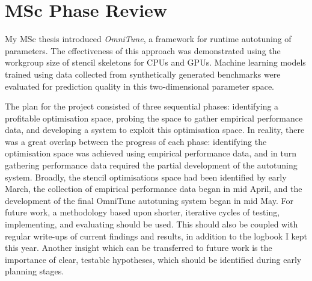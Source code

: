 \documentclass[11pt]{article}
\begin{document}




\section{MSc Phase Review}

My MSc thesis introduced \textit{OmniTune}, a framework for runtime
autotuning of parameters. The effectiveness of this approach was
demonstrated using the workgroup size of stencil skeletons for CPUs
and GPUs. Machine learning models trained using data collected from
synthetically generated benchmarks were evaluated for prediction
quality in this two-dimensional parameter space.

The plan for the project consisted of three sequential phases:
identifying a profitable optimisation space, probing the space to
gather empirical performance data, and developing a system to exploit
this optimisation space. In reality, there was a great overlap between
the progress of each phase: identifying the optimisation space was
achieved using empirical performance data, and in turn gathering
performance data required the partial development of the autotuning
system. Broadly, the stencil optimisations space had been identified
by early March, the collection of empirical performance data began in
mid April, and the development of the final OmniTune autotuning system
began in mid May. For future work, a methodology based upon shorter,
iterative cycles of testing, implementing, and evaluating should be
used. This should also be coupled with regular write-ups of current
findings and results, in addition to the logbook I kept this
year. Another insight which can be transferred to future work is the
importance of clear, testable hypotheses, which should be identified
during early planning
stages. %
\end{document}
